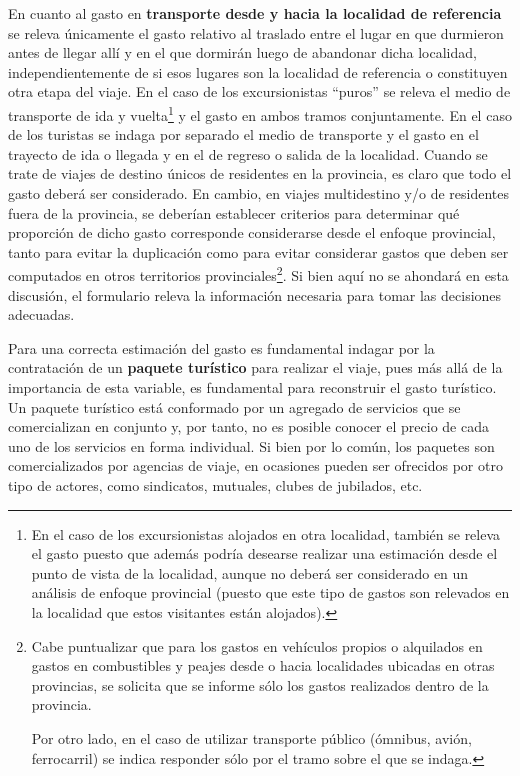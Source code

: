 \documentclass[
]{book}
\begin{document}
En cuanto al gasto en \textbf{transporte desde y hacia la localidad de referencia} se releva únicamente el gasto relativo al traslado entre el lugar en que durmieron antes de llegar allí y en el que dormirán luego de abandonar dicha localidad, independientemente de si esos lugares son la localidad de referencia o constituyen otra etapa del viaje. En el caso de los excursionistas ``puros'' se releva el medio de transporte de ida y vuelta\footnote{En el caso de los excursionistas alojados en otra localidad, también se releva el gasto puesto que además podría desearse realizar una estimación desde el punto de vista de la localidad, aunque no deberá ser considerado en un análisis de enfoque provincial (puesto que este tipo de gastos son relevados en la localidad que estos visitantes están alojados).} y el gasto en ambos tramos conjuntamente. En el caso de los turistas se indaga por separado el medio de transporte y el gasto en el trayecto de ida o llegada y en el de regreso o salida de la localidad. Cuando se trate de viajes de destino únicos de residentes en la provincia, es claro que todo el gasto deberá ser considerado. En cambio, en viajes multidestino y/o de residentes fuera de la provincia, se deberían establecer criterios para determinar qué proporción de dicho gasto corresponde considerarse desde el enfoque provincial, tanto para evitar la duplicación como para evitar considerar gastos que deben ser computados en otros territorios provinciales\footnote{Cabe puntualizar que para los gastos en vehículos propios o alquilados en gastos en combustibles y peajes desde o hacia localidades ubicadas en otras provincias, se solicita que se informe sólo los gastos realizados dentro de la provincia.

  Por otro lado, en el caso de utilizar transporte público (ómnibus, avión, ferrocarril) se indica responder sólo por el tramo sobre el que se indaga.}. Si bien aquí no se ahondará en esta discusión, el formulario releva la información necesaria para tomar las decisiones adecuadas.

Para una correcta estimación del gasto es fundamental indagar por la contratación de un \textbf{paquete turístico} para realizar el viaje, pues más allá de la importancia de esta variable, es fundamental para reconstruir el gasto turístico. Un paquete turístico está conformado por un agregado de servicios que se comercializan en conjunto y, por tanto, no es posible conocer el precio de cada uno de los servicios en forma individual. Si bien por lo común, los paquetes son comercializados por agencias de viaje, en ocasiones pueden ser ofrecidos por otro tipo de actores, como sindicatos, mutuales, clubes de jubilados, etc.
\end{document}
